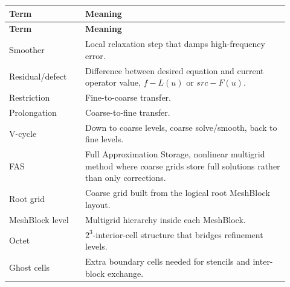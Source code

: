 \documentclass[11pt]{article}
\begin{document}
\begin{longtable}{p{0.25\linewidth} p{0.67\linewidth}}
\toprule
\textbf{Term} & \textbf{Meaning} \\
\midrule
\endfirsthead
\toprule
\textbf{Term} & \textbf{Meaning} \\
\midrule
\endhead
Smoother & Local relaxation step that damps high-frequency error. \\
Residual/defect & Difference between desired equation and current operator value,
\(f-L(u)\) or \(src-F(u)\). \\
Restriction & Fine-to-coarse transfer. \\
Prolongation & Coarse-to-fine transfer. \\
V-cycle & Down to coarse levels, coarse solve/smooth, back to fine levels. \\
FAS & Full Approximation Storage, nonlinear multigrid method where coarse grids
store full solutions rather than only corrections. \\
Root grid & Coarse grid built from the logical root MeshBlock layout. \\
MeshBlock level & Multigrid hierarchy inside each MeshBlock. \\
Octet & \(2^3\)-interior-cell structure that bridges refinement levels. \\
Ghost cells & Extra boundary cells needed for stencils and inter-block exchange. \\
\bottomrule
\end{longtable}
\end{document}
